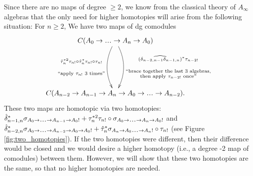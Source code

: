 Since there are no maps of degree 
$\geq2$, we know from the classical 
theory of $A_\infty$ algebras that 
the only need for higher homotopies 
will arise from the following 
situation: For $n\geq2$, 
We have two maps of dg comodules
\begin{equation}
\label{eq:two_maps}
\xymatrixrowsep{5pc}
\xymatrix{
C(A_0 \to \smdots \to A_n \to A_0) 
 \ar@/^1pc/[d]^{\substack{
   (\widehat{\delta_{n-2,n-1}\delta_{n-1,n}})^*
   \tau_{n-2!}\\\\\\
   \textrm{$``$brace together the last 3 algebras,}\\
   \textrm{then apply $\tau_{n-2!}$ once''}}}
 \ar@/_1pc/[d]_{\substack{
   \hat{\tau}_n^{*2} \tau_{n!}\circ
   \hat{\tau}_n^*\tau_{n!}\circ \tau_{n!}\\\\\\
   \textrm{$``$apply $\tau_{n!}$ 3 times''}}}\\
C(A_{n-2} \to A_{n-1} \to A_n \to 
A_0 \to \smdots \to A_{n-2}).
}
\end{equation}
These two maps are homotopic via 
two homotopies: 
$\hat{\delta}_{n-1,n}^*
\sigma_{A_0 \to \smdots \to A_{n-1}\to A_0!}
+ \tau_n^{*2}\tau_{n!} \circ 
\sigma_{A_0 \to \smdots \to A_n\to A_0!}$ 
and 
$\hat{\delta}_{n-2,n}^*
\sigma_{A_0 \to \smdots \to A_{n-2}\to A_0 \to A_0!} +
\hat{\tau}_n^*\sigma_{A_n \to A_0 \smdots \to A_n!}
\circ \tau_{n!}$ (see Figure 
\ref{fig:two_homotopies}). If the 
two homotopies were different, then 
their difference would be closed and
we would desire a higher homotopy (i.e., 
a degree -2 map of comodules) between 
them. However, we will show that these 
two homotopies are the same, so that 
no higher homotopies are needed.
%
